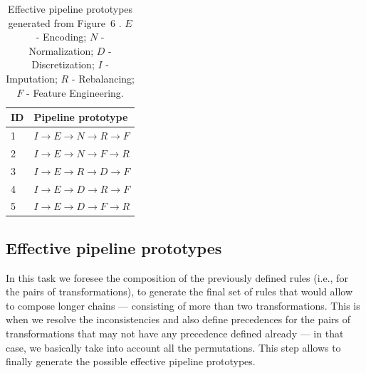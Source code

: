 \begin{example}
\begin{table}[t]
	\caption{Effective pipeline prototypes generated from Figure~6%
	. $E$ - Encoding; $N$ - Normalization; $D$ - Discretization; $I$ - Imputation; $R$ - Rebalancing; $F$ - Feature Engineering.
	}
	\footnotesize
	\label{tbl:effective-pipelines}
	\begin{center}
		\begin{tabular}{@{}ll}
			\toprule
			ID& Pipeline prototype                                             \\ \toprule
			1&{\color[HTML]{000000} $I\rightarrow E\rightarrow N \rightarrow R\rightarrow F$} \\
			2&{\color[HTML]{000000} $I\rightarrow E\rightarrow N \rightarrow F\rightarrow R$} \\
			3&{\color[HTML]{000000} $I\rightarrow E\rightarrow R \rightarrow D\rightarrow F$} \\
			4&{\color[HTML]{000000} $I\rightarrow E\rightarrow D \rightarrow R\rightarrow F$} \\
			5&{\color[HTML]{000000} $I\rightarrow E\rightarrow D \rightarrow F\rightarrow R$} \\
			\bottomrule
		\end{tabular}
	\end{center}
\end{table}
\fi

\end{example}
\subsection{Effective pipeline prototypes}
\label{sec:composition}
In this task we foresee the composition of the previously defined rules (i.e., for the pairs of transformations), to generate the final set of rules that would allow to compose longer chains --- consisting of more than two transformations. This is when we resolve the inconsistencies and also define precedences for the pairs of transformations that may not have any precedence defined already --- in that case, we basically take into account all the permutations. This step allows to finally generate the possible effective pipeline prototypes. 

